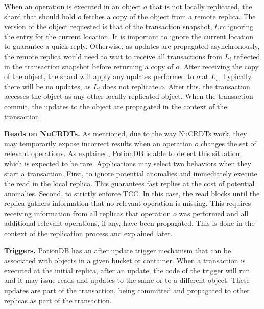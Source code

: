 \documentclass[sigplan,twocolumn,review,anonymous]{acmart}
\newcommand{\andre}[1]{\nbnote{Andre}{blue}{#1}}
\begin{document}
When an operation is executed in an object $o$ that is not locally replicated, 
the shard that should hold $o$ fetches 
a copy of the object from a remote replica. The version of the object 
requested is that
of the transaction snapshot,  $t\!.\mathit{rc}$ ignoring the entry for the current location.
It is important to ignore the current location to guarantee a quick reply. 
Otherwise, as updates are propagated asynchronously, the remote replica would need to wait to
receive all transactions from $L_i$ reflected in the transaction snapshot before returning a copy
of $o$.
After receiving the copy of the object, the shard will apply any updates performed to $o$ at $L_i$. Typically,
there will be no updates, as $L_i$ does not replicate $o$.
After this, the transaction accesses the object as any other locally replicated object. When the transaction commit, 
the updates to the object are propagated in the context of the transaction.

\noindent
\textbf{Reads on NuCRDTs.}
As mentioned, due to the way NuCRDTs work, they may temporarily expose 
incorrect results when an operation $o$ changes the set of relevant operations.  
As explained, PotionDB is able to detect this situation, which is expected to be rare. 
Applications may select two behaviors when they start a transaction.
First, to ignore potential anomalies and immediately execute the read in the local replica.
This guarantees fast replies at the cost of potential anomalies. 
%
Second, to strictly enforce TCC. In this case, the read blocks until the replica gathers 
information that no relevant operation is missing. This requires receiving information from
all replicas that operation $o$ was performed and all additional relevant operations, if any, have been
propagated. This is done in the context of the replication process and explained later.

\noindent
\textbf{Triggers.}
PotionDB has an after update trigger mechanism that can be associated with 
objects in a given bucket or container.
When a transaction is executed at the initial replica, after an update, the code
of the trigger will run and it may issue reads and updates to the same or to a different object.
These updates are part of the transaction, being committed and propagated to other replicas
as part of the transaction.
\end{document}
